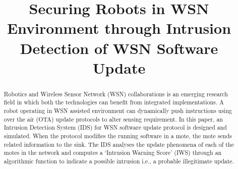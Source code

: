 \documentclass[conference,manuscript]{IEEEtran}
\begin{document}
\title{Securing Robots in WSN Environment through Intrusion Detection of WSN Software Update}

\author{
}



\maketitle

\begin{abstract}
Robotics and  Wireless Sensor Network (WSN) collaborations is an emerging research field in which both the technologies can benefit from integrated implementations.
A robot operating in WSN assisted environment can dynamically push instructions using over the air (OTA) update protocols to alter sensing requirement.
In this paper, an Intrusion Detection System (IDS) for WSN  software update protocol is designed and simulated. 
When the protocol modifies the running software in a mote, the mote sends related  information to the sink. 
The IDS analyses the update phenomena of each of the motes in the network and computes a `Intrusion Warning Score' (IWS) through an algorithmic function to indicate a possible intrusion i.e., a probable illegitimate update.
\end{abstract}



%
\IEEEpeerreviewmaketitle %
\end{document}
